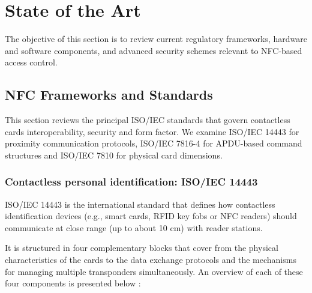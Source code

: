 \chapter{State of the Art}
\label{chap:state_of_the_art}

The objective of this section is to review current regulatory frameworks, hardware and software components, and advanced security schemes relevant to NFC-based access control.


\section{NFC Frameworks and Standards}

This section reviews the principal ISO/IEC standards that govern contactless cards interoperability, security and form factor. We examine ISO/IEC 14443 \cite{ref23} for proximity communication protocols, ISO/IEC 7816-4 \cite{ref24} for APDU-based command structures and ISO/IEC 7810 \cite{ref25} for physical card dimensions.

\subsection{Contactless personal identification: ISO/IEC 14443}

ISO/IEC 14443 \cite{ref23} is the international standard that defines how contactless identification devices (e.g., smart cards, RFID key fobs or NFC readers) should communicate at close range (up to about 10 cm) with reader stations.

It is structured in four complementary blocks that cover from the physical characteristics of the cards to the data exchange protocols and the mechanisms for managing multiple transponders simultaneously. An overview of each of these four components is presented below \cite{ref65}:

